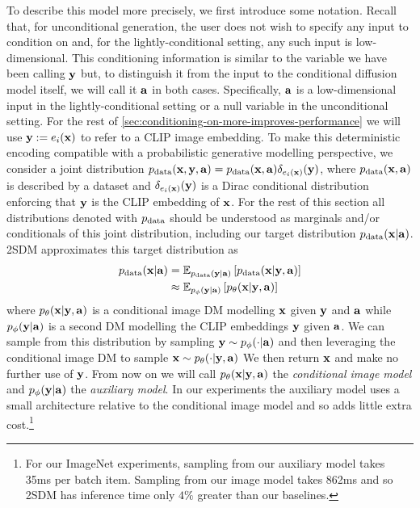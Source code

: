 To describe this model more precisely, we first introduce some notation. Recall that, for unconditional generation, the user does not wish to specify any input to condition on and, for the lightly-conditional setting, any such input is low-dimensional. This conditioning information is similar to the variable we have been calling ${\mathbf{y}}$ but, to distinguish it from the input to the conditional diffusion model itself, we will call it ${\mathbf{a}}$ in both cases. Specifically, ${\mathbf{a}}$ is a low-dimensional input in the lightly-conditional setting or a null variable in the unconditional setting. For the rest of \cref{sec:conditioning-on-more-improves-performance} we will use ${\mathbf{y}} := e_i({\mathbf{x}})$ to refer to a CLIP image embedding. To make this deterministic encoding compatible with a probabilistic generative modelling perspective, we consider a joint distribution $p_{\rm{data}}({\mathbf{x}}, {\mathbf{y}}, {\mathbf{a}})=p_{\rm{data}}({\mathbf{x}}, {\mathbf{a}})\delta_{e_i({\mathbf{x}})}({\mathbf{y}})$, where $p_{\rm{data}}({\mathbf{x}}, {\mathbf{a}})$ is described by a dataset and $\delta_{e_i({\mathbf{x}})}({\mathbf{y}})$ is a Dirac conditional distribution enforcing that ${\mathbf{y}}$ is the CLIP embedding of ${\mathbf{x}}$. For the rest of this section all distributions denoted with $p_{\rm{data}}$ should be understood as marginals and/or conditionals of this joint distribution, including our target distribution $p_{\rm{data}}({\mathbf{x}}|{\mathbf{a}})$. 2SDM approximates this target distribution as
%
\begin{align} \label{eq:no-a}
    \pdata(\rvx|\rva) &= \mathbb{E}_{\pdata(\rvy|\rva)} \left[ \pdata(\rvx|\rvy,\rva) \right] \\
    &\approx \mathbb{E}_{p_\phi(\rvy|\rva)} \left[ p_\theta(\rvx|\rvy,\rva) \right] %
\end{align}
where $p_\theta({\mathbf{x}}|{\mathbf{y}},{\mathbf{a}})$ is a conditional image DM modelling ${\mathbf{x}}$ given ${\mathbf{y}}$ and ${\mathbf{a}}$ while $p_\phi({\mathbf{y}}|{\mathbf{a}})$ is a second DM modelling the CLIP embeddings ${\mathbf{y}}$ given ${\mathbf{a}}$. We can sample from this distribution by sampling ${\mathbf{y}}\sim p_\phi(\cdot|{\mathbf{a}})$ and then leveraging the conditional image DM to sample ${\mathbf{x}} \sim p_\theta(\cdot|{\mathbf{y}},{\mathbf{a}})$ We then return ${\mathbf{x}}$ and make no further use of ${\mathbf{y}}$.
%
From now on we will call $p_\theta({\mathbf{x}}|{\mathbf{y}},{\mathbf{a}})$ the \textit{conditional image model} and $p_\phi({\mathbf{y}}|{\mathbf{a}})$ the \textit{auxiliary model}. In our experiments the auxiliary model uses a small architecture relative to the conditional image model and so adds little extra cost.\footnote{For our ImageNet experiments, sampling from our auxiliary model takes 35ms per batch item. Sampling from our image model takes 862ms and so 2SDM has inference time only $4\%$ greater than our baselines.}


